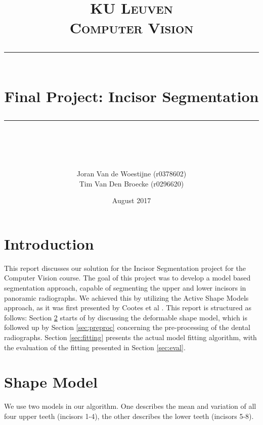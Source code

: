 \documentclass[a4paper,titlepage,12pt]{article}
\begin{document}
 
\newcommand{\horrule}[1]{\rule{\linewidth}{#1}}     %

\title{
        \normalfont \normalsize \textsc{KU Leuven} \\ [25pt]
        \normalfont \normalsize \textsc{Computer Vision} 
        \horrule{2pt} \\[0.5cm]
        \huge Final Project: Incisor Segmentation \\
        \horrule{2pt} \\[0.5cm]
}
\author{
        \normalfont            
        Joran Van de Woestijne (r0378602)\\
        Tim Van Den Broecke (r0296620)
}
\date{August 2017}
 
\maketitle

\newpage
\tableofcontents
\thispagestyle{empty}
\newpage
\setcounter{page}{1}

\section{Introduction}

This report discusses our solution for the Incisor Segmentation project for the Computer Vision course.
The goal of this project was to develop a model based segmentation approach, capable of segmenting the upper and lower incisors in panoramic radiographs.
We achieved this by utilizing the Active Shape Models approach, as it was first presented by Cootes et al \cite{cootes2000introduction}.
This report is structured as follows: 
Section \ref{sec:shape} starts of by discussing the deformable shape model, which is followed up by Section \ref{sec:preproc} concerning the pre-processing of the dental radiographs. Section \ref{sec:fitting} presents the actual model fitting algorithm, with the evaluation of the fitting presented in Section \ref{sec:eval}.

\section{Shape Model}
\label{sec:shape}
We use two models in our algorithm. One describes the mean and variation of all four upper teeth (incisors 1-4), the other describes the lower teeth (incisors 5-8). 
\end{document}
